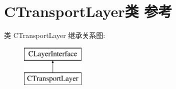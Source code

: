 \hypertarget{class_c_transport_layer}{}\section{C\+Transport\+Layer类 参考}
\label{class_c_transport_layer}
类 C\+Transport\+Layer 继承关系图\+:\begin{figure}[H]
\begin{center}
\leavevmode
\includegraphics[height=2.000000cm]{class_c_transport_layer}
\end{center}
\end{figure}
